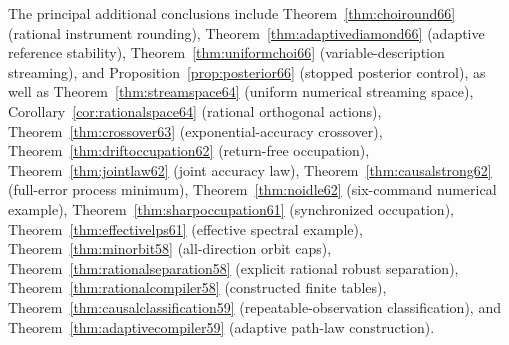 \documentclass[11pt]{amsart}
\numberwithin{equation}{section}
\theoremstyle{definition}\newtheorem{definition}[theorem]{Definition}
\theoremstyle{remark}\newtheorem{remark}[theorem]{Remark}
\begin{document}
\noindent The principal additional conclusions include
Theorem~\ref{thm:choiround66} (rational instrument rounding),
Theorem~\ref{thm:adaptivediamond66} (adaptive reference stability),
Theorem~\ref{thm:uniformchoi66} (variable-description streaming),
and Proposition~\ref{prop:posterior66} (stopped posterior control),
as well as
Theorem~\ref{thm:streamspace64} (uniform numerical streaming space),
Corollary~\ref{cor:rationalspace64} (rational orthogonal actions),
Theorem~\ref{thm:crossover63} (exponential-accuracy crossover),
Theorem~\ref{thm:driftoccupation62} (return-free occupation),
Theorem~\ref{thm:jointlaw62} (joint accuracy law),
Theorem~\ref{thm:causalstrong62} (full-error process minimum),
Theorem~\ref{thm:noidle62} (six-command numerical example),
Theorem~\ref{thm:sharpoccupation61} (synchronized occupation),
Theorem~\ref{thm:effectivelps61} (effective spectral example),
Theorem~\ref{thm:minorbit58} (all-direction orbit caps),
Theorem~\ref{thm:rationalseparation58} (explicit rational robust separation),
Theorem~\ref{thm:rationalcompiler58} (constructed finite tables),
Theorem~\ref{thm:causalclassification59} (repeatable-observation
classification), and Theorem~\ref{thm:adaptivecompiler59} (adaptive
path-law construction).














































\appendix


\end{document}
